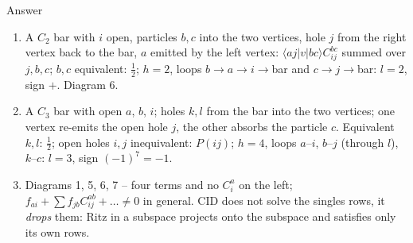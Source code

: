 \documentclass[aspectratio=169,10pt]{beamer}
\newcounter{thinkctr}
\newcommand{\thinka}[1]{%
  \begin{tcolorbox}[colback=paleteal,colframe=teal,title={\bfseries Answer to pause \#\thethinkctr}]
  #1
  \end{tcolorbox}}
\newcommand{\element}[3]{\langle #1\vert #2\vert #3\rangle}
\begin{document}
\begin{frame}{Answer}
  \thinka{
  \begin{enumerate}
    \item A $C_2$ bar with $i$ open, particles $b,c$ into the two vertices, hole $j$ from the right vertex back to the bar, $a$ emitted by the left vertex: $\element{aj}{v}{bc}C_{ij}^{bc}$ summed over $j,b,c$; $b,c$ equivalent: $\frac12$; $h=2$, loops $b\to a\to i\to$bar and $c\to j\to$bar: $l=2$, sign $+$. Diagram 6.
    \item A $C_3$ bar with open $a$, $b$, $i$; holes $k,l$ from the bar into the two vertices; one vertex re-emits the open hole $j$, the other absorbs the particle $c$. Equivalent $k,l$: $\frac12$; open holes $i,j$ inequivalent: $P(ij)$; $h=4$, loops $a$--$i$, $b$--$j$ (through $l$), $k$--$c$: $l=3$, sign $(-1)^7=-1$. \checkmark
    \item Diagrams 1, 5, 6, 7 -- four terms and no $C_i^a$ on the left; $f_{ai}+\sum f_{jb}C_{ij}^{ab}+\dots\neq0$ in general. CID does not solve the singles rows, it \emph{drops} them: Ritz in a subspace projects onto the subspace and satisfies only its own rows.
  \end{enumerate}}
\end{frame}
\end{document}
